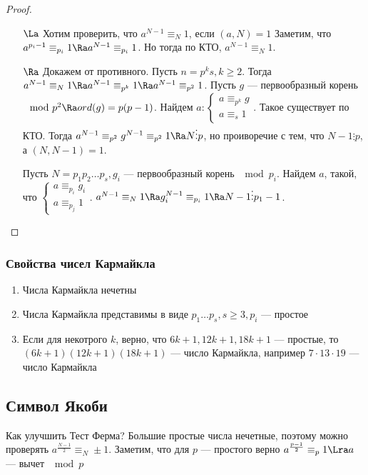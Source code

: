 \begin{proof}\indent
    \begin{enumerate}
        \item[\(\La\)] Хотим проверить, что \(a^{N - 1} \equiv_N 1\), если \((a, N) = 1\) Заметим, что \(a^{p_i - 1} \equiv_{p_i} 1 \Ra a^{N - 1} \equiv_{p_i} 1\). Но тогда по КТО, \(a^{N - 1} \equiv_N 1\).
        \item[\(\Ra\)]
        Докажем от противного. Пусть \(n = p^ks, k \ge 2\). Тогда \(a^{N - 1} \equiv_N 1 \Ra a^{N - 1} \equiv_{p^k} 1 \Ra a^{N - 1} \equiv_{p^2} 1\). Пусть \(g\) --- первообразный корень \(\mod p^2 \Ra ord(g) = p(p - 1)\). Найдем \(a: \left\{\begin{array}{l}
            a \equiv_{p^k} g \\
            a \equiv_s 1
        \end{array}\right.\). Такое существует по КТО. Тогда \(a^{N - 1} \equiv_{p^2} g^{N - 1} \equiv_{p^2} 1 \Ra N \vdots p\), но проиворечие с тем, что \(N - 1 \vdots p\), а \((N, N - 1) = 1\).
        
        Пусть \(N = p_1p_2\dots p_s, g_i\) --- первообразный корень \(\mod p_i\). Найдем \(a\), такой, что \(\left\{\begin{array}{l}
            a \equiv_{p_i} g_i \\
            a \equiv_{p_j} 1
        \end{array}\right.\). \(a^{N - 1} \equiv_N 1 \Ra g_i^{N - 1} \equiv_{p_i} 1 \Ra N - 1 \vdots p_1 - 1\).
    \end{enumerate}
\end{proof}

\subsubsection{Свойства чисел Кармайкла}
\begin{enumerate}
    \item Числа Кармайкла нечетны
    \item Числа Кармайкла представимы в виде \(p_1\dots p_s, s \ge 3, p_i\) --- простое
    \item Если для некотрого \(k\), верно, что \(6k + 1, 12k + 1, 18k + 1\) --- простые, то \((6k + 1)(12k + 1)(18k + 1)\) --- число Кармайкла, например \(7\cdot13\cdot19\) --- число Кармайкла
\end{enumerate}

\subsection{Символ Якоби}
Как улучшить Тест Ферма? Большие простые числа нечетные, поэтому можно проверять \(a^{\frac{N - 1}{2}} \equiv_N \pm1\). Заметим, что для \(p\) --- простого верно \(a^{\frac{p - 1}{2}} \equiv_p 1 \Lra a\) --- вычет \(\mod p\)

